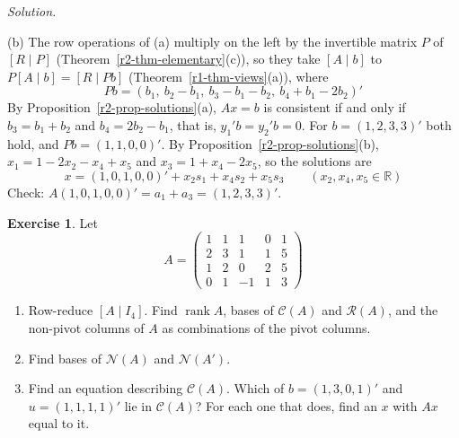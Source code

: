 \documentclass[12pt]{article}
\newcommand{\R}{\mathbb R}
\DeclareMathOperator{\rank}{rank}
\theoremstyle{definition}
\newtheorem{exercise}{Exercise}
\newenvironment{solution}{\par\noindent\textit{Solution.}\ }{\par\smallskip}
\begin{document}
\begin{solution}
\begin{itemize}
\end{itemize}
(b) The row operations of (a) multiply on the left by the invertible matrix \(P\) of
\([R\mid P]\) (Theorem~\ref{r2-thm-elementary}(c)), so they take \([A\mid b]\) to
\(P[A\mid b]=[R\mid Pb]\) (Theorem~\ref{r1-thm-views}(a)), where
\[
Pb=(b_1,\ b_2-b_1,\ b_3-b_1-b_2,\ b_4+b_1-2b_2)'
\]
By Proposition~\ref{r2-prop-solutions}(a), \(Ax=b\) is consistent if and only if
\(b_3=b_1+b_2\) and \(b_4=2b_2-b_1\), that is, \(y_1'b=y_2'b=0\). For \(b=(1,2,3,3)'\) both hold, and
\(Pb=(1,1,0,0)'\). By Proposition~\ref{r2-prop-solutions}(b), \(x_1=1-2x_2-x_4+x_5\) and
\(x_3=1+x_4-2x_5\), so the solutions are
\[
x=(1,0,1,0,0)'+x_2s_1+x_4s_2+x_5s_3\qquad(x_2,x_4,x_5\in\R)
\]
Check: \(A(1,0,1,0,0)'=a_1+a_3=(1,2,3,3)'\).
\end{solution}

\begin{exercise}\label{r4-dr-four-subspaces}
Let
\[
A=\begin{pmatrix}1&1&1&0&1\\2&3&1&1&5\\1&2&0&2&5\\0&1&-1&1&3\end{pmatrix}
\]
\begin{enumerate}
\item Row-reduce \([A\mid I_4]\). Find \(\rank A\), bases of \(\mathcal C(A)\) and \(\mathcal R(A)\), and the non-pivot
columns of \(A\) as combinations of the pivot columns.
\item Find bases of \(\mathcal N(A)\) and \(\mathcal N(A')\).
\item Find an equation describing \(\mathcal C(A)\). Which of \(b=(1,3,0,1)'\) and \(u=(1,1,1,1)'\) lie in
\(\mathcal C(A)\)? For each one that does, find an \(x\) with \(Ax\) equal to it.
\end{enumerate}
\end{exercise}
\end{document}
